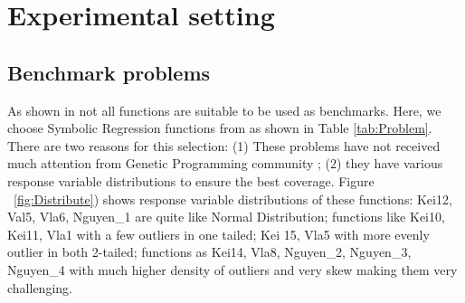 \section{Experimental setting}
\label{Exp}
\subsection{Benchmark problems}
\label{Ben}
As shown in \cite{2015Mig} not all functions are suitable to be used as benchmarks. Here, we choose Symbolic Regression functions from \cite{2012James} as shown in Table \ref{tab:Problem}. There are two reasons for this selection: (1) These problems have not received much attention from Genetic Programming community \cite{David2013}; (2) they have various response variable distributions to ensure the best coverage. Figure ~\ref{fig:Distribute}) shows response variable distributions of these functions: Kei12, Val5, Vla6, Nguyen\_1 are quite like Normal Distribution; functions like Kei10, Kei11, Vla1 with a few outliers in one tailed; Kei 15, Vla5 with more evenly outlier in both 2-tailed; functions as Kei14, Vla8, Nguyen\_2, Nguyen\_3, Nguyen\_4 with much higher density of outliers and very skew making them very challenging. \par

